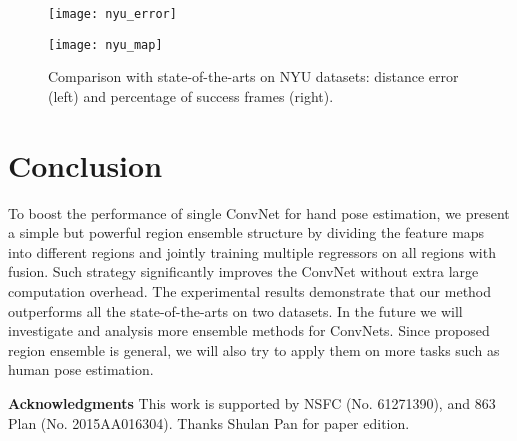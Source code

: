 \documentclass{article}
\begin{document}
\begin{figure*}[htb]
\begin{minipage}[b]{0.49\textwidth}
  \centering
  \centerline{\texttt{[image: nyu\_error]}}
\end{minipage}
\begin{minipage}[b]{0.49\textwidth}
  \centering
  \centerline{\texttt{[image: nyu\_map]}}
\end{minipage}
\caption{Comparison with state-of-the-arts on NYU \cite{tompson2014real} datasets: distance error (left) and percentage of success frames (right).}
\label{fig_sota_nyu}
\end{figure*}

\section{Conclusion}
To boost the performance of single ConvNet for hand pose estimation, we present a simple but powerful region ensemble structure by dividing the feature maps into different regions and jointly training multiple regressors on all regions with fusion. Such strategy significantly improves the ConvNet without extra large computation overhead. The experimental results demonstrate that our method outperforms all the state-of-the-arts on two datasets. In the future we will investigate and analysis more ensemble methods for ConvNets. Since proposed region ensemble is general, we will also try to apply them on more tasks such as human pose estimation.

\noindent\textbf{Acknowledgments}\hspace{2mm} This work is supported by NSFC (No. 61271390), and 863 Plan (No. 2015AA016304). Thanks Shulan Pan for paper edition.




\end{document}
